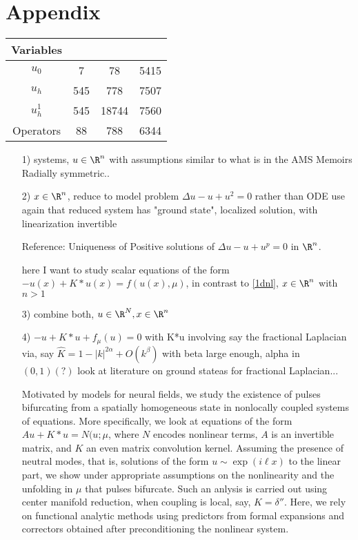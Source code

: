 \section{Appendix}
\begin{center}
 \begin{tabular}{|c c c c|} 
 \hline
 Variables &  &  &  \\ 
 \hline
 $u_0$ & 7 & 78 & 5415 \\
 \hline
 $u_h$ & 545 & 778 & 7507 \\
 \hline
 $u_h^1$ & 545 & 18744 & 7560 \\
 \hline
 Operators & 88 & 788 & 6344 \\ [1ex] 
 \hline
\end{tabular}
\end{center}


\begin{itemize}
\item [1)] systems, $u \in \R^n$ with assumptions similar to what is in the AMS Memoirs Radially symmetric.. 


\item [2)] $x \in \R^n$, reduce to model problem $\Delta u -u + u^2 =0$ rather than ODE
use again that reduced system has "ground state", localized solution, 
with linearization invertible


Reference: Uniqueness of Positive solutions of $\Delta u -u+u^p = 0$ in $\R^n$.

here I want to study scalar equations of the form 
$-u(x) + K\ast u(x) = f(u(x),\mu)$, in contrast to \ref{1dnl}, $x \in \R^n$ with $n>1$

\item [3)] combine both, $u \in \R^N, x \in \R^n$


\item [4)] $-u+ K*u + f_\mu(u)=0$
with K*u involving say the fractional Laplacian via, say
$\hat{K}= 1-|k|^{2 \alpha} + O(k^\beta)$
with beta large enough, alpha in $(0,1) (?)$
look at literature on ground stateas for fractional Laplacian...



Motivated by models for neural fields, we study the existence of pulses  bifurcating from a spatially homogeneous state in nonlocally coupled systems of equations. More specifically, we look at equations of the form $Au + K*u = N(u;\mu$, where $N$ encodes nonlinear terms, $A$ is an invertible matrix, and $K$ an even matrix convolution kernel. Assuming the presence of neutral modes, that is, solutions of the form $u\sim \exp(i \ell x)$ to the linear part, we show under appropriate assumptions on the nonlinearity and the unfolding in $\mu$ that pulses bifurcate. Such an anlysis is carried out using center manifold reduction, when coupling is local, say, $K=\delta''$. Here, we rely on functional analytic methods using predictors from formal expansions and correctors obtained after preconditioning the nonlinear system.
\end{itemize}
